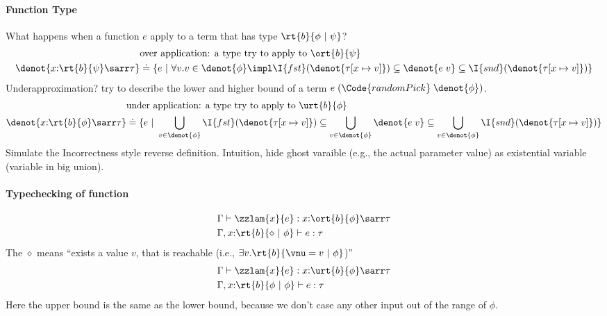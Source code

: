 \paragraph{Function Type} What happens when a function $e$ apply to a term that has type $\rt{b}{\phi ~|~ \psi}$?
\begin{align*}
    &\text{over application: a type try to apply to $\ort{b}{\psi}$}
    \\ \denot{x{:}\rt{b}{\psi} \sarr \tau} &\doteq \{ e ~|~ \forall v. v \in \denot{\phi} \impl \I{fst}(\denot{\tau[x\mapsto v]}) \subseteq \denot{e\;v} \subseteq \I{snd}(\denot{\tau[x\mapsto v]}) \}
\end{align*}\noindent
Underapproximation? try to describe the lower and higher bound of a term $e\;(\Code{randomPick}\;\denot{\phi})$.
\begin{align*}
    &\text{under application: a type try to apply to $\urt{b}{\phi}$}
    \\ \denot{x{:}\rt{b}{\phi} \sarr \tau} &\doteq \{ e ~|~ \bigcup_{v \in \denot{\phi}} \I{fst}(\denot{\tau[x\mapsto v]}) \subseteq \bigcup_{v \in \denot{\phi}} \denot{e\;v} \subseteq \bigcup_{v \in \denot{\phi}} \I{snd}(\denot{\tau[x\mapsto v]}) \}
\end{align*}\noindent
Simulate the Incorrectness style reverse definition. Intuition, hide ghost varaible (e.g., the actual parameter value) as existential variable (variable in big union).

\paragraph{Typechecking of function}
\begin{align*}
    &\Gamma \vdash \zzlam{x}{e} : x{:}\ort{b}{\phi} \sarr \tau
    \\&\Gamma, x{:}\rt{b}{ \diamond ~|~ \phi} \vdash e : \tau
\end{align*}\noindent
The $\diamond$ means ``exists a value $v$, that is reachable (i.e., $\exists v. \rt{b}{ \vnu = v ~|~ \phi}$)''
\begin{align*}
    &\Gamma \vdash \zzlam{x}{e} : x{:}\urt{b}{\phi} \sarr \tau
    \\&\Gamma, x{:}\rt{b}{ \phi ~|~ \phi} \vdash e : \tau
\end{align*}\noindent
Here the upper bound is the same as the lower bound, because we don't case any other input out of the range of $\phi$.

